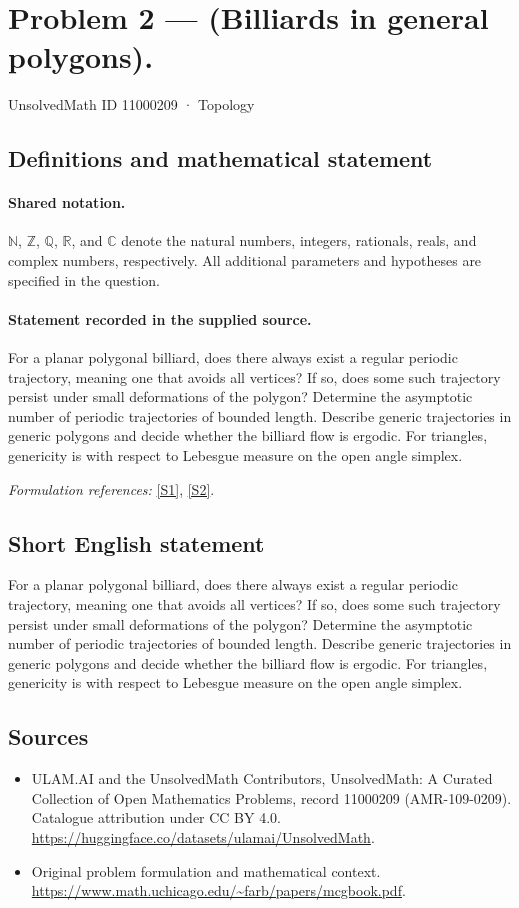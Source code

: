 \documentclass[11pt]{article}
\newcommand{\sref}[2]{\hyperlink{source:#1:#2}{[S#2]}}
\begin{document}
\setcounter{section}{11000208}
\section{Problem 2 — (Billiards in general polygons).}\label{11000209}
{\small UnsolvedMath ID 11000209 · Topology}
\subsection{Definitions and mathematical statement}

\paragraph{Shared notation.}$\mathbb N$, $\mathbb Z$, $\mathbb Q$, $\mathbb R$, and $\mathbb C$ denote the natural numbers, integers, rationals, reals, and complex numbers, respectively. All additional parameters and hypotheses are specified in the question.


\paragraph{Statement recorded in the supplied source.}
For a planar polygonal billiard, does there always exist a regular periodic trajectory, meaning one that avoids all vertices? If so, does some such trajectory persist under small deformations of the polygon? Determine the asymptotic number of periodic trajectories of bounded length. Describe generic trajectories in generic polygons and decide whether the billiard flow is ergodic. For triangles, genericity is with respect to Lebesgue measure on the open angle simplex.
\par\smallskip\textit{Formulation references:} \sref{11000209}{1}, \sref{11000209}{2}.
\subsection{Short English statement}
For a planar polygonal billiard, does there always exist a regular periodic trajectory, meaning one that avoids all vertices? If so, does some such trajectory persist under small deformations of the polygon? Determine the asymptotic number of periodic trajectories of bounded length. Describe generic trajectories in generic polygons and decide whether the billiard flow is ergodic. For triangles, genericity is with respect to Lebesgue measure on the open angle simplex.
\subsection{Sources}
\begin{itemize}
\item[\hypertarget{source:11000209:1}{S1}] ULAM.AI and the UnsolvedMath Contributors, UnsolvedMath: A Curated Collection of Open Mathematics Problems, record 11000209 (AMR-109-0209). Catalogue attribution under CC BY 4.0.
\url{https://huggingface.co/datasets/ulamai/UnsolvedMath}.
\item[\hypertarget{source:11000209:2}{S2}] Original problem formulation and mathematical context.
\url{https://www.math.uchicago.edu/~farb/papers/mcgbook.pdf}.
\end{itemize}
\label{end:11000209}
\end{document}
